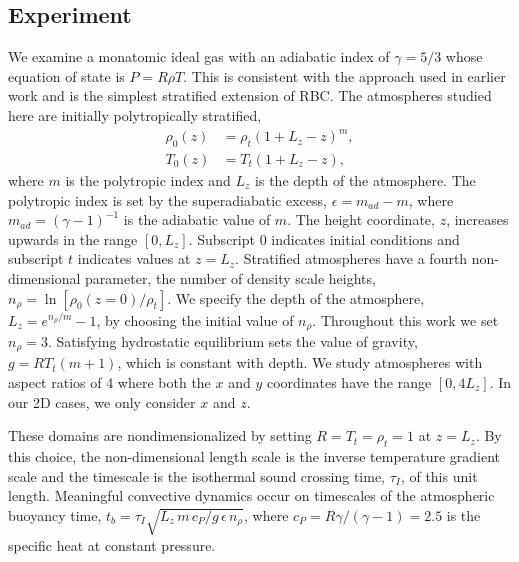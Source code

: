 \subsection{Experiment} 
\label{sec:experiment}
We examine a monatomic ideal gas with an adiabatic index of
$\gamma = 5/3$ whose equation of state is $P = R\rho T$. This is consistent with the approach used in earlier work 
\cite{graham1975, chan&all1982, brandenburg&all2005,
hurlburt&all1984, cattaneo&all1990, cattaneo&all1991, brummell&all1996} 
and is the simplest stratified extension of RBC.
The atmospheres studied here are initially polytropically stratified,
\begin{equation}
\begin{split}
\rho_0(z) &= \rho_{t}(1 + L_z - z)^m, \\
T_0(z)    &= T_{t}(1 + L_z - z),
\label{eqn:polytrope}
\end{split}
\end{equation}
where $m$ is the polytropic index and $L_z$ is the depth of the atmosphere.
The polytropic
index is set by the superadiabatic excess, $\epsilon = m_{ad} - m$, where
$m_{ad} = (\gamma - 1)^{-1}$ is the adiabatic value of $m$.
The height coordinate, $z$, increases upwards in the range $[0, L_z]$.
Subscript 0 indicates initial conditions and subscript $t$ indicates values
at $z = L_z$.   Stratified atmospheres have a fourth non-dimensional parameter,
the number of density scale heights, $n_{\rho} = \ln\left[\rho_0(z=0)/\rho_t\right]$.  We
specify the depth of the atmosphere, $L_z = e^{n_{\rho}/m} - 1$, by choosing
the initial value of $n_{\rho}$.
Throughout this work we set $n_{\rho} = 3$.    Satisfying hydrostatic
equilibrium sets the value of gravity, $g = RT_t (m + 1)$, which is
constant with depth.  We study atmospheres with aspect
ratios of 4 where both the $x$ and $y$ coordinates have the range $[0, 4L_z]$.
In our 2D cases, we only consider $x$ and $z$.

These domains are nondimensionalized by setting
$R = T_t = \rho_t = 1$ at $z = L_z$.
By this choice, the non-dimensional
length scale is the inverse temperature gradient scale and the 
timescale is the isothermal sound crossing time, 
$\tau_I$, of this unit length.
Meaningful convective dynamics occur on 
timescales of the atmospheric buoyancy time,
$t_b = \tau_I \sqrt{L_z\,m\,c_P/g\,\epsilon\,n_\rho}$, where
$c_P = R \gamma/(\gamma-1) = 2.5$ is the specific heat at constant pressure.

